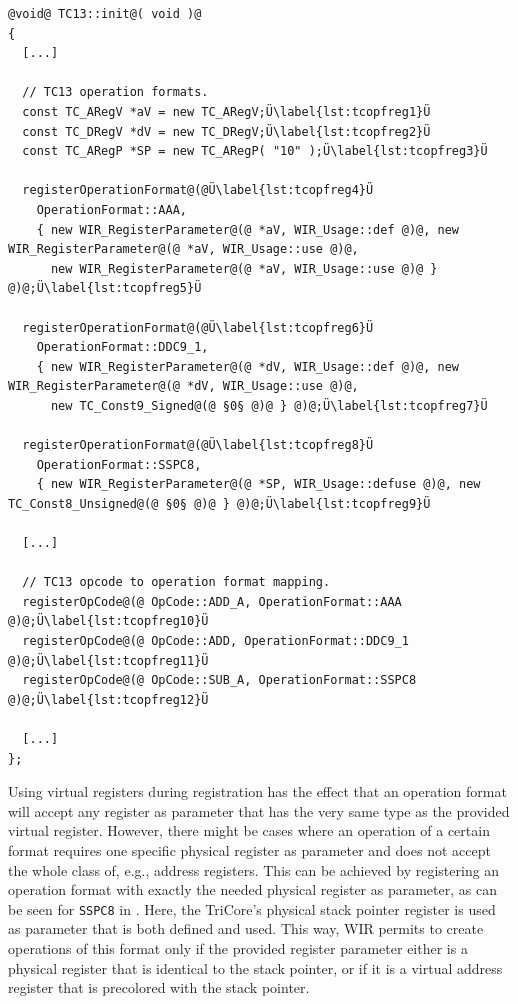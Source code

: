\begin{lstlisting}[style=code,float=t,caption={Operation Format Registration (here for Class \texttt{TC13})},label=lst:tcopfreg]
@void@ TC13::init@( void )@
{
  [...]

  // TC13 operation formats.
  const TC_ARegV *aV = new TC_ARegV;Ü\label{lst:tcopfreg1}Ü
  const TC_DRegV *dV = new TC_DRegV;Ü\label{lst:tcopfreg2}Ü
  const TC_ARegP *SP = new TC_ARegP( "10" );Ü\label{lst:tcopfreg3}Ü

  registerOperationFormat@(@Ü\label{lst:tcopfreg4}Ü
    OperationFormat::AAA,
    { new WIR_RegisterParameter@(@ *aV, WIR_Usage::def @)@, new WIR_RegisterParameter@(@ *aV, WIR_Usage::use @)@,
      new WIR_RegisterParameter@(@ *aV, WIR_Usage::use @)@ } @)@;Ü\label{lst:tcopfreg5}Ü

  registerOperationFormat@(@Ü\label{lst:tcopfreg6}Ü
    OperationFormat::DDC9_1,
    { new WIR_RegisterParameter@(@ *dV, WIR_Usage::def @)@, new WIR_RegisterParameter@(@ *dV, WIR_Usage::use @)@,
      new TC_Const9_Signed@(@ §0§ @)@ } @)@;Ü\label{lst:tcopfreg7}Ü

  registerOperationFormat@(@Ü\label{lst:tcopfreg8}Ü
    OperationFormat::SSPC8,
    { new WIR_RegisterParameter@(@ *SP, WIR_Usage::defuse @)@, new TC_Const8_Unsigned@(@ §0§ @)@ } @)@;Ü\label{lst:tcopfreg9}Ü

  [...]

  // TC13 opcode to operation format mapping.
  registerOpCode@(@ OpCode::ADD_A, OperationFormat::AAA @)@;Ü\label{lst:tcopfreg10}Ü
  registerOpCode@(@ OpCode::ADD, OperationFormat::DDC9_1 @)@;Ü\label{lst:tcopfreg11}Ü
  registerOpCode@(@ OpCode::SUB_A, OperationFormat::SSPC8 @)@;Ü\label{lst:tcopfreg12}Ü

  [...]
};
\end{lstlisting}

Using virtual registers during registration has the effect that an operation format will accept any register as parameter that has the very same type as the provided virtual register.
However, there might be cases where an operation of a certain format requires one specific physical register as parameter and does not accept the whole class of, e.g., address registers.
This can be achieved by registering an operation format with exactly the needed physical register as parameter, as can be seen for \texttt{SSPC8} in .
Here, the TriCore's physical stack pointer register is used as parameter that is both defined and used.
This way, \gls{WIR} permits to create operations of this format only if the provided register parameter either is a physical register that is identical to the stack pointer, or if it is a virtual address register that is precolored with the stack pointer.

